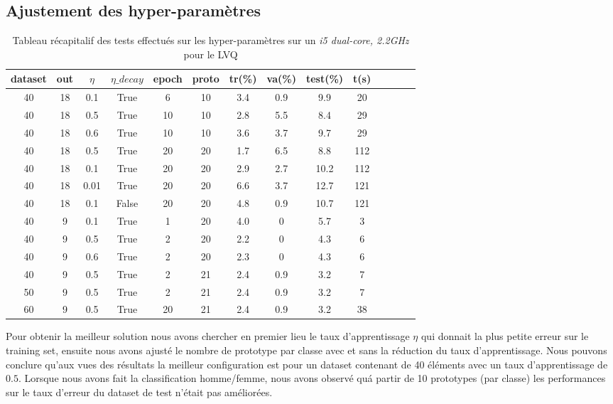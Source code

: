\documentclass[11pt]{article}
\begin{document}
\subsection{Ajustement des hyper-param\`etres}
\begin{table}[h]
	\centering
	\begin{tabular}{|c|c|c|c|c|c|c|c|c|c|c|c|c|c|}
		\hline
		dataset & out  & $\eta$ & $\eta\_decay$ & epoch  & proto  & tr(\%) & va(\%) & test(\%) & t(s)\\
		\hline		
		40	& 18 & 0.1 & True & 6 & 10 & 3.4 & 0.9 & 9.9 & 20\\
		\hline
		\rowcolor{green}		
		40	& 18 & 0.5 & True & 10 & 10 & 2.8 & 5.5 & 8.4 & 29\\
		\hline		
		40	& 18 & 0.6 & True & 10 & 10 & 3.6 & 3.7 & 9.7 & 29\\
		\hline		
		40	& 18 & 0.5 & True & 20 & 20 & 1.7 & 6.5 & 8.8 & 112\\
		\hline		
		40	& 18 & 0.1 & True & 20 & 20 & 2.9 & 2.7 & 10.2 & 112\\
		\hline		
		40	& 18 & 0.01 & True & 20 & 20 & 6.6 & 3.7 & 12.7 & 121\\
		\hline		
		40	& 18 & 0.1 & False & 20 & 20 & 4.8 & 0.9 & 10.7 & 121\\
		\hline		
		40	& 9 & 0.1 & True & 1 & 20 & 4.0 & 0 & 5.7 & 3\\
		\hline		
		40	& 9 & 0.5 & True & 2 & 20 & 2.2 & 0 & 4.3 & 6\\
		\hline
		40	& 9 & 0.6 & True & 2 & 20 & 2.3 & 0 & 4.3 & 6\\
		\hline
		\rowcolor{green}
		40	& 9 & 0.5 & True & 2 & 21 & 2.4 & 0.9 & 3.2 & 7\\
		\hline
		50  & 9 & 0.5 & True & 2 & 21 & 2.4 & 0.9 & 3.2 & 7\\
		\hline
		60  & 9 & 0.5 & True & 20 & 21 & 2.4 & 0.9 & 3.2 & 38\\
		\hline
\end{tabular}
  \caption{Tableau r\'ecapitalif des tests effectu\'es sur les
	hyper-param\`etres sur un {\em i5 dual-core, 2.2GHz} pour le LVQ }
\end{table}


Pour obtenir la meilleur solution nous avons chercher en premier lieu le
taux d'apprentissage $\eta$  qui donnait la plus petite erreur sur le training
set, ensuite nous avons ajust\'e le nombre de prototype par classe avec et sans
la r\'eduction du taux d'apprentissage. Nous pouvons conclure qu'aux vues des
r\'esultats la meilleur configuration est pour un dataset contenant de 40
\'el\'ements avec un taux d'apprentissage de $0.5$.
Lorsque nous avons fait la classification homme/femme, nous avons observ\'e
qu\'a partir de 10 prototypes (par classe) les performances sur le taux
d'erreur du dataset de test n'\'etait pas am\'elior\'ees.
\end{document}
